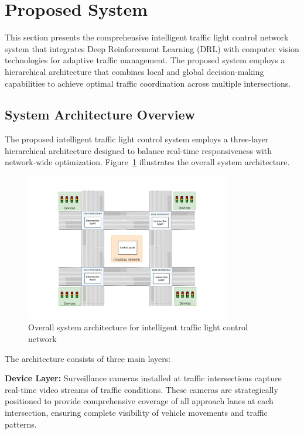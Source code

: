\section{Proposed System}\label{sec2a}

This section presents the comprehensive intelligent traffic light control network system that integrates 
Deep Reinforcement Learning (DRL) with computer vision technologies for adaptive traffic management. 
The proposed system employs a hierarchical architecture that combines local and global decision-making 
capabilities to achieve optimal traffic coordination across multiple intersections.

\subsection{System Architecture Overview}\label{subsec2a-1}

The proposed intelligent traffic light control system employs a three-layer hierarchical architecture 
designed to balance real-time responsiveness with network-wide optimization. Figure~\ref{fig:system_overview} 
illustrates the overall system architecture.

\begin{figure}[!htb]
    \centering
    \includegraphics[width=0.8\textwidth]{figures/ch3_system_overview_architecture.png}
    \caption{Overall system architecture for intelligent traffic light control network}
    \label{fig:system_overview}
\end{figure}

The architecture consists of three main layers:

\textbf{Device Layer:} Surveillance cameras installed at traffic intersections capture real-time video 
streams of traffic conditions. These cameras are strategically positioned to provide comprehensive 
coverage of all approach lanes at each intersection, ensuring complete visibility of vehicle movements 
and traffic patterns.

